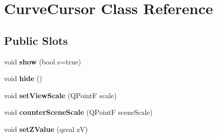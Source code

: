 \hypertarget{class_curve_cursor}{
\section{\-Curve\-Cursor \-Class \-Reference}
\label{class_curve_cursor}
}
\subsection*{\-Public \-Slots}
\begin{DoxyCompactItemize}
\item 
\hypertarget{class_curve_cursor_ae6a9c8f4063319d8cf0db32ceb0d5b52}{
void {\bfseries show} (bool s=true)}
\label{class_curve_cursor_ae6a9c8f4063319d8cf0db32ceb0d5b52}

\item 
\hypertarget{class_curve_cursor_afc4d5c7ceb4c43c73341dbb394738471}{
void {\bfseries hide} ()}
\label{class_curve_cursor_afc4d5c7ceb4c43c73341dbb394738471}

\item 
\hypertarget{class_curve_cursor_a36ca6fdc44a779d9a535ac75c7e1572f}{
void {\bfseries set\-View\-Scale} (\-Q\-Point\-F scale)}
\label{class_curve_cursor_a36ca6fdc44a779d9a535ac75c7e1572f}

\item 
\hypertarget{class_curve_cursor_a5be7193acb8a2598eb1dda507fcade9c}{
void {\bfseries counter\-Scene\-Scale} (\-Q\-Point\-F scene\-Scale)}
\label{class_curve_cursor_a5be7193acb8a2598eb1dda507fcade9c}

\item 
\hypertarget{class_curve_cursor_a490865eee77fde6ce14e44d2d270823b}{
void {\bfseries set\-Z\-Value} (qreal z\-V)}
\label{class_curve_cursor_a490865eee77fde6ce14e44d2d270823b}

\end{DoxyCompactItemize}
